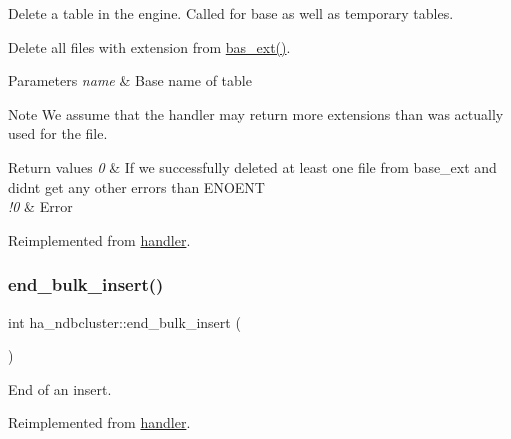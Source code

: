 Delete a table in the engine. Called for base as well as temporary tables.

Delete all files with extension from \mbox{\hyperlink{classha__ndbcluster_ade5341ce688c24b5885145f821cdf249}{bas\+\_\+ext()}}.


\begin{DoxyParams}{Parameters}
{\em name} & Base name of table\\
\hline
\end{DoxyParams}
\begin{DoxyNote}{Note}
We assume that the handler may return more extensions than was actually used for the file.
\end{DoxyNote}

\begin{DoxyRetVals}{Return values}
{\em 0} & If we successfully deleted at least one file from base\+\_\+ext and didn\textquotesingle{}t get any other errors than E\+N\+O\+E\+NT \\
\hline
{\em !0} & Error \\
\hline
\end{DoxyRetVals}


Reimplemented from \mbox{\hyperlink{classhandler_ae53ec34116b901cc08e5a87f5ec681a6}{handler}}.

\mbox{\label{classha__ndbcluster_a38b1458caf3677f93276073e22669aeb}} 
\subsubsection{\texorpdfstring{end\+\_\+bulk\+\_\+insert()}{end\_bulk\_insert()}}
{\footnotesize\ttfamily int ha\+\_\+ndbcluster\+::end\+\_\+bulk\+\_\+insert (\begin{DoxyParamCaption}{ }\end{DoxyParamCaption})\hspace{0.3cm}{\ttfamily [virtual]}}

End of an insert. 

Reimplemented from \mbox{\hyperlink{classhandler}{handler}}.

\mbox{\label{classha__ndbcluster_a3c3b80b72e921059f62aed3eda1db911}} 
